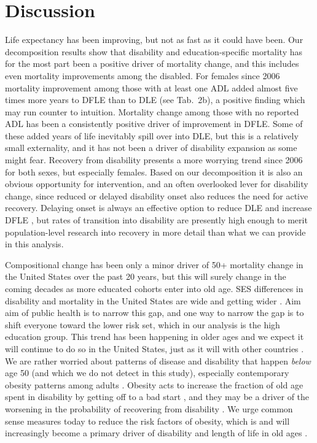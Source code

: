 \section{Discussion}
\label{sec:discussion}
Life expectancy has been improving, but not as fast as it could have been. Our decomposition results show that disability and education-specific mortality has for the most part been a positive driver of mortality change, and this includes even mortality improvements among the disabled. For females since 2006 mortality improvement among those with at least one ADL added almost five times more years to DFLE than to DLE (see Tab.~2b), a positive finding which may run counter to intuition. Mortality change among those with no reported ADL has been a consistently positive driver of improvement in DFLE. Some of these added years of life inevitably spill over into DLE, but this is a relatively small externality, and it has not been a driver of disability expansion as some might fear. Recovery from disability presents a more worrying trend since 2006 for both sexes, but especially females. Based on our decomposition it is also an obvious opportunity for intervention, and an often overlooked lever for disability change, since reduced or delayed disability onset also reduces the need for active recovery. Delaying onset is always an effective option to reduce DLE and increase DFLE \citep[c.f.][]{freedman2016disability}, but rates of transition into disability are presently high enough to merit population-level research into recovery in more detail than what we can provide in this analysis.

Compositional change has been only a minor driver of 50+ mortality change in the United States over the past 20 years, but this will surely change in the coming decades as more educated cohorts enter into old age. SES differences in disability and mortality in the United States are wide and getting wider \citep{montez2014cumulative}. Aim aim of public health is to narrow this gap, and one way to narrow the gap is to shift everyone toward the lower risk set, which in our analysis is the high education group. This trend has been happening in older ages and we expect it will continue to do so in the United States, just as it will with other countries \citep{kc2010projection}. We are rather worried about patterns of disease and disability that happen \emph{below} age 50 (and which we do not detect in this study), especially contemporary obesity patterns among adults \citep{flegal2012prevalence}. Obesity acts to increase the fraction of old age spent in disability by getting off to a bad start \citep{alley2007changing}, and they may be a driver of the worsening in the probability of recovering from disability \citep[c.f.,][]{walter2009mortality}. We urge common sense measures today to reduce the risk factors of obesity, which is and will increasingly become a primary driver of disability and length of life in old ages \citep{mehta2017population}.

